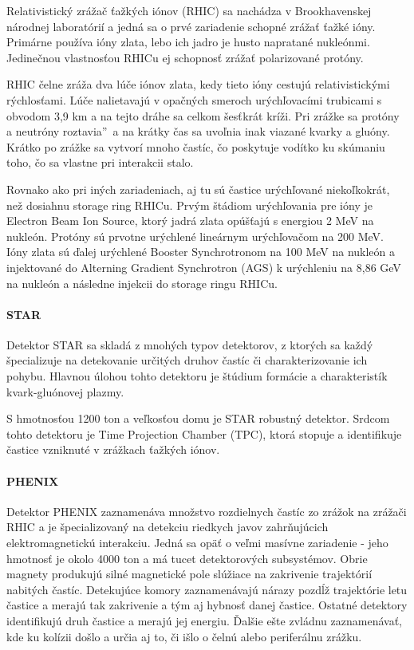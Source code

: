 \documentclass[../../main.tex]{subfiles}
\begin{document}
Relativistický zrážač ťažkých iónov (RHIC) sa nachádza v Brookhavenskej národnej laboratórií a jedná sa o prvé zariadenie schopné zrážať ťažké ióny. Primárne používa ióny zlata, lebo ich jadro je husto napratané nukleónmi. Jedinečnou vlastnosťou RHICu ej schopnosť zrážať polarizované protóny.

RHIC čelne zráža dva lúče iónov zlata, kedy tieto ióny cestujú relativistickými rýchlosťami. Lúče nalietavajú v opačných smeroch urýchľovacími trubicami s obvodom 3,9 km a na tejto dráhe sa celkom šesťkrát kríži. Pri zrážke sa protóny a neutróny \quotedblbase roztavia\textquotedblright ~a na krátky čas sa uvoľnia inak viazané kvarky a gluóny. Krátko po zrážke sa vytvorí mnoho častíc, čo poskytuje vodítko ku skúmaniu toho, čo sa vlastne pri interakcii stalo.

Rovnako ako pri iných zariadeniach, aj tu sú častice urýchľované niekoľkokrát, než dosiahnu storage ring RHICu.
Prvým štádiom urýchľovania pre ióny je Electron Beam Ion Source, ktorý jadrá zlata opúšťajú s energiou 2 MeV na nukleón. Protóny sú prvotne urýchlené lineárnym urýchľovačom na 200 MeV. Ióny zlata sú ďalej urýchlené Booster Synchrotronom na 100 MeV na nukleón a injektované do Alterning Gradient Synchrotron (AGS) k urýchleniu na 8,86 GeV na nukleón a následne injekcii do storage ringu RHICu. 

\paragraph{STAR}

Detektor STAR sa skladá z mnohých typov detektorov, z ktorých sa každý špecializuje na detekovanie určitých druhov častíc či charakterizovanie ich pohybu. Hlavnou úlohou tohto detektoru je štúdium formácie a charakteristík kvark-gluónovej plazmy.

S hmotnosťou 1200 ton a veľkosťou domu je STAR robustný detektor. Srdcom tohto detektoru je Time Projection Chamber (TPC), ktorá stopuje a identifikuje častice vzniknuté v zrážkach ťažkých iónov.

\paragraph{PHENIX}

Detektor PHENIX zaznamenáva množstvo rozdielnych častíc zo zrážok na zrážači RHIC a je špecializovaný na detekciu riedkych javov zahrňujúcich elektromagnetickú interakciu. Jedná sa opäť o veľmi masívne zariadenie - jeho hmotnosť je okolo 4000 ton a má tucet detektorových subsystémov. Obrie magnety produkujú silné magnetické pole slúžiace na zakrivenie trajektórií nabitých častíc. Detekujúce komory zaznamenávajú nárazy pozdĺž trajektórie letu častice a merajú tak zakrivenie a tým aj hybnosť danej častice. Ostatné detektory identifikujú druh častice a merajú jej energiu. Ďalšie ešte zvládnu zaznamenávať, kde ku kolízii došlo a určia aj to, či išlo o čelnú alebo periferálnu zrážku.
\end{document}
